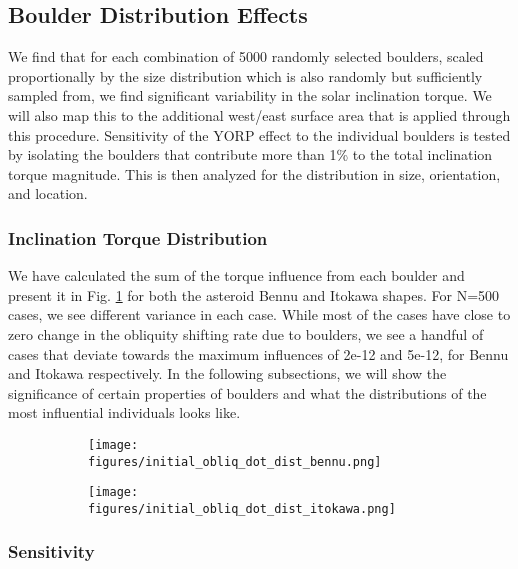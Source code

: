\documentclass[12pt,notitlepage]{article}
\begin{document}
\subsection{Boulder Distribution Effects}
We find that for each combination of 5000 randomly selected boulders, scaled proportionally by the size distribution which is also randomly but sufficiently sampled from, we find significant variability in the solar inclination torque. We will also map this to the additional west/east surface area that is applied through this procedure. Sensitivity of the YORP effect to the individual boulders is tested by isolating the boulders that contribute more than 1\% to the total inclination torque magnitude. This is then analyzed for the distribution in size, orientation, and location.
\subsubsection{Inclination Torque Distribution}
We have calculated the sum of the torque influence from each boulder and present it in Fig. \ref{fig:is_results} for both the asteroid Bennu and Itokawa shapes. For N=500 cases, we see different variance in each case. While most of the cases have close to zero change in the obliquity shifting rate due to boulders, we see a handful of cases that deviate towards the maximum influences of 2e-12 and 5e-12, for Bennu and Itokawa respectively. In the following subsections, we will show the significance of certain properties of boulders and what the distributions of the most influential individuals looks like.

\begin{figure}[H]
    \begin{subfigure}{0.49\textwidth}
        \centering
        \texttt{[image: figures/initial\_obliq\_dot\_dist\_bennu.png]}
        \caption{}
    \end{subfigure}
    \hfill
    \begin{subfigure}{0.49\textwidth}
        \centering
        \texttt{[image: figures/initial\_obliq\_dot\_dist\_itokawa.png]}
        \caption{}
    \end{subfigure}  
    \caption{}
    \label{fig:is_results}
\end{figure}


\subsubsection{Sensitivity}
\end{document}
